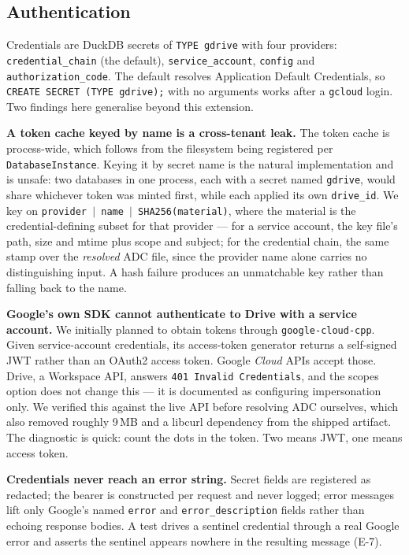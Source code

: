 \documentclass[sigconf, nonacm]{acmart}
\newcommand{\expref}[1]{\textsf{E-#1}}
\begin{document}
\subsection{Authentication}
\label{sec:auth}

Credentials are DuckDB secrets of \texttt{TYPE gdrive} with four providers:
\texttt{credential\_chain} (the default), \texttt{service\_account},
\texttt{config} and \texttt{authorization\_code}. The default resolves
Application Default Credentials, so \texttt{CREATE SECRET (TYPE gdrive);} with
no arguments works after a \texttt{gcloud} login. Two findings here generalise
beyond this extension.

\textbf{A token cache keyed by name is a cross-tenant leak.}
The token cache is process-wide, which follows from the filesystem being
registered per \texttt{DatabaseInstance}. Keying it by secret name is the
natural implementation and is unsafe: two databases in one process, each with
a secret named \texttt{gdrive}, would share whichever token was minted first,
while each applied its own \texttt{drive\_id}. We key on
\texttt{provider\,$\vert$\,name\,$\vert$\,SHA256(material)}, where the material
is the credential-defining subset for that provider --- for a service account,
the key file's path, size and mtime plus scope and subject; for the credential
chain, the same stamp over the \emph{resolved} ADC file, since the provider
name alone carries no distinguishing input. A hash failure produces an
unmatchable key rather than falling back to the name.

\textbf{Google's own SDK cannot authenticate to Drive with a service account.}
We initially planned to obtain tokens through \texttt{google-cloud-cpp}. Given
service-account credentials, its access-token generator returns a self-signed
JWT rather than an OAuth2 access token. Google \emph{Cloud} APIs accept those.
Drive, a Workspace API, answers \texttt{401 Invalid Credentials}, and the
scopes option does not change this --- it is documented as configuring
impersonation only. We verified this against the live API before resolving ADC
ourselves, which also removed roughly 9\,MB and a libcurl dependency from the
shipped artifact. The diagnostic is quick: count the dots in the token. Two
means JWT, one means access token.

\textbf{Credentials never reach an error string.}
Secret fields are registered as redacted; the bearer is constructed per
request and never logged; error messages lift only Google's named
\texttt{error} and \texttt{error\_description} fields rather than echoing
response bodies. A test drives a sentinel credential through a real Google
error and asserts the sentinel appears nowhere in the resulting message
(\expref{7}).
\end{document}
